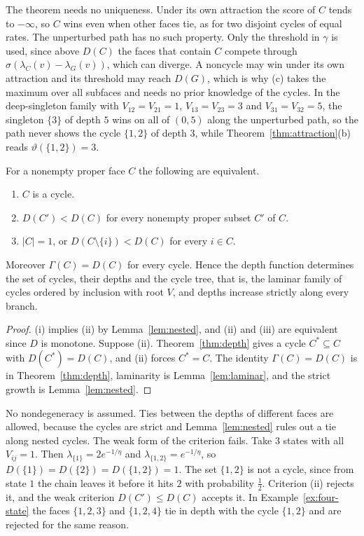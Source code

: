 The theorem needs no uniqueness. Under its own attraction the score of $C$
tends to $-\infty$, so $C$ wins even when other faces tie, as for two disjoint
cycles of equal rates. The unperturbed path has no such property.
Only the threshold in $\gamma$ is used, since above $D(C)$ the faces that
contain $C$ compete through $\sigma(\lambda_C(v)-\lambda_G(v))$, which can
diverge. A noncycle may win under its own attraction and its threshold may
reach $D(G)$, which is why (c) takes the maximum over all subfaces and needs no
prior knowledge of the cycles. In the deep-singleton family with
$V_{12}=V_{21}=1$, $V_{13}=V_{23}=3$ and $V_{31}=V_{32}=5$, the singleton
$\{3\}$ of depth $5$ wins on all of $(0,5)$ along the unperturbed path, so the
path never shows the cycle $\{1,2\}$ of depth $3$, while
Theorem~\ref{thm:attraction}(b) reads $\vartheta(\{1,2\})=3$.

\begin{theorem}\label{thm:cycles-from-depths}
For a nonempty proper face $C$ the following are equivalent.
\begin{enumerate}
\item[(i)] $C$ is a cycle.
\item[(ii)] $D(C')<D(C)$ for every nonempty proper subset $C'$ of $C$.
\item[(iii)] $|C|=1$, or $D(C\setminus\{i\})<D(C)$ for every $i\in C$.
\end{enumerate}
Moreover $\Gamma(C)=D(C)$ for every cycle. Hence the depth function determines
the set of cycles, their depths and the cycle tree, that is, the laminar
family of cycles ordered by inclusion with root $V$, and depths increase
strictly along every branch.
\end{theorem}

\begin{proof}
(i) implies (ii) by Lemma~\ref{lem:nested}, and (ii) and (iii) are equivalent
since $D$ is monotone. Suppose (ii). Theorem~\ref{thm:depth} gives a cycle
$C^*\subseteq C$ with $D(C^*)=D(C)$, and (ii) forces $C^*=C$. The identity
$\Gamma(C)=D(C)$ is in Theorem~\ref{thm:depth}, laminarity is
Lemma~\ref{lem:laminar}, and the strict growth is Lemma~\ref{lem:nested}.
\end{proof}

No nondegeneracy is assumed. Ties between the depths of different faces are
allowed, because the cycles are strict and Lemma~\ref{lem:nested} rules out a
tie along nested cycles. The weak form of the criterion fails. Take 3
states with all $V_{ij}=1$. Then $\lambda_{\{1\}}=2e^{-1/\eta}$ and
$\lambda_{\{1,2\}}=e^{-1/\eta}$, so $D(\{1\})=D(\{2\})=D(\{1,2\})=1$. The set
$\{1,2\}$ is not a cycle, since from state $1$ the chain leaves it before it
hits $2$ with probability $\frac12$. Criterion (ii) rejects it, and the weak
criterion $D(C')\le D(C)$ accepts it. In Example~\ref{ex:four-state} the faces
$\{1,2,3\}$ and $\{1,2,4\}$ tie in depth with the cycle $\{1,2\}$ and are
rejected for the same reason.

